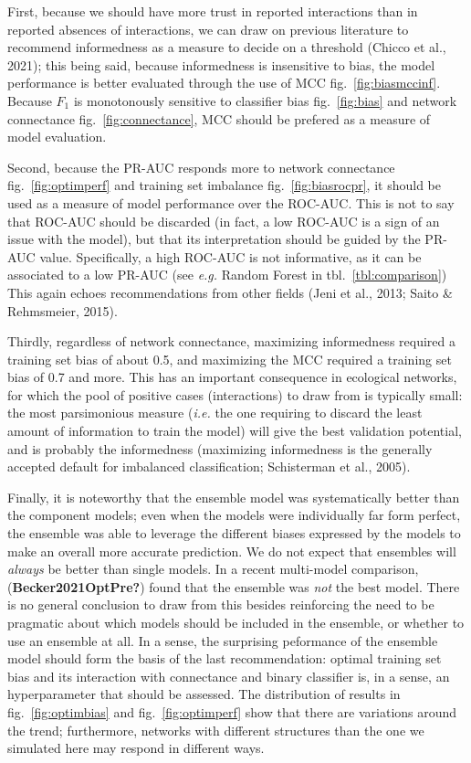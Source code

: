 \documentclass[10pt,oneside]{article}
\begin{document}
First, because we should have more trust in reported interactions than
in reported absences of interactions, we can draw on previous literature
to recommend informedness as a measure to decide on a threshold (Chicco
et al., 2021); this being said, because informedness is insensitive to
bias, the model performance is better evaluated through the use of MCC
fig.~\ref{fig:biasmccinf}. Because \(F_1\) is monotonously sensitive to
classifier bias fig.~\ref{fig:bias} and network connectance
fig.~\ref{fig:connectance}, MCC should be prefered as a measure of model
evaluation.

Second, because the PR-AUC responds more to network connectance
fig.~\ref{fig:optimperf} and training set imbalance
fig.~\ref{fig:biasrocpr}, it should be used as a measure of model
performance over the ROC-AUC. This is not to say that ROC-AUC should be
discarded (in fact, a low ROC-AUC is a sign of an issue with the model),
but that its interpretation should be guided by the PR-AUC value.
Specifically, a high ROC-AUC is not informative, as it can be associated
to a low PR-AUC (see \emph{e.g.} Random Forest in
tbl.~\ref{tbl:comparison}) This again echoes recommendations from other
fields (Jeni et al., 2013; Saito \& Rehmsmeier, 2015).

Thirdly, regardless of network connectance, maximizing informedness
required a training set bias of about 0.5, and maximizing the MCC
required a training set bias of 0.7 and more. This has an important
consequence in ecological networks, for which the pool of positive cases
(interactions) to draw from is typically small: the most parsimonious
measure (\emph{i.e.} the one requiring to discard the least amount of
information to train the model) will give the best validation potential,
and is probably the informedness (maximizing informedness is the
generally accepted default for imbalanced classification; Schisterman et
al., 2005).

Finally, it is noteworthy that the ensemble model was systematically
better than the component models; even when the models were individually
far form perfect, the ensemble was able to leverage the different biases
expressed by the models to make an overall more accurate prediction. We
do not expect that ensembles will \emph{always} be better than single
models. In a recent multi-model comparison, (\textbf{Becker2021OptPre?})
found that the ensemble was \emph{not} the best model. There is no
general conclusion to draw from this besides reinforcing the need to be
pragmatic about which models should be included in the ensemble, or
whether to use an ensemble at all. In a sense, the surprising peformance
of the ensemble model should form the basis of the last recommendation:
optimal training set bias and its interaction with connectance and
binary classifier is, in a sense, an hyperparameter that should be
assessed. The distribution of results in fig.~\ref{fig:optimbias} and
fig.~\ref{fig:optimperf} show that there are variations around the
trend; furthermore, networks with different structures than the one we
simulated here may respond in different ways.
\end{document}
